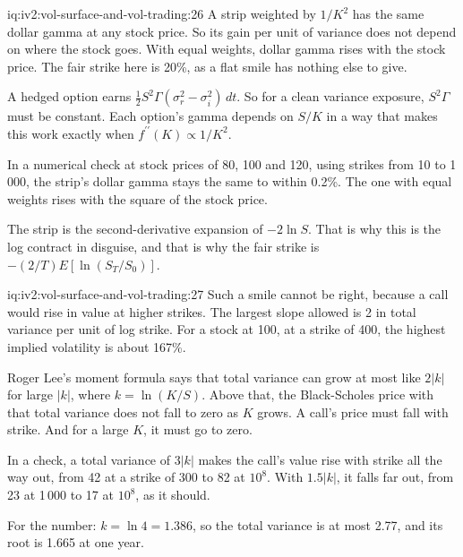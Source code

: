 \begin{solution}{iq:iv2:vol-surface-and-vol-trading:26}
A strip weighted by $1/K^2$ has the same dollar gamma at any stock price. So its gain per unit of variance does not depend on where the stock goes. With equal weights, dollar gamma rises with the stock price. The fair strike here is 20\%, as a flat smile has nothing else to give.

A hedged option earns $\tfrac12S^2\Gamma(\sigma_r^2 - \sigma_i^2)\,dt$. So for a clean variance exposure, $S^2\Gamma$ must be constant. Each option's gamma depends on $S/K$ in a way that makes this work exactly when $f^{\prime\prime}(K) \propto 1/K^2$.

In a numerical check at stock prices of 80, 100 and 120, using strikes from 10 to 1\,000, the strip's dollar gamma stays the same to within 0.2\%. The one with equal weights rises with the square of the stock price.

The strip is the second-derivative expansion of $-2\ln S$. That is why this is the log contract in disguise, and that is why the fair strike is $-(2/T)E[\ln(S_T/S_0)]$.

\end{solution}

\begin{solution}{iq:iv2:vol-surface-and-vol-trading:27}
Such a smile cannot be right, because a call would rise in value at higher strikes. The largest slope allowed is 2 in total variance per unit of log strike. For a stock at 100, at a strike of 400, the highest implied volatility is about 167\%.

Roger Lee's moment formula says that total variance can grow at most like $2|k|$ for large $|k|$, where $k = \ln(K/S)$. Above that, the Black-Scholes price with that total variance does not fall to zero as $K$ grows. A call's price must fall with strike. And for a large $K$, it must go to zero.

In a check, a total variance of $3|k|$ makes the call's value rise with strike all the way out, from 42 at a strike of 300 to 82 at $10^8$. With $1.5|k|$, it falls far out, from 23 at 1\,000 to 17 at $10^8$, as it should.

For the number: $k = \ln 4 = 1.386$, so the total variance is at most 2.77, and its root is 1.665 at one year.

\end{solution}

